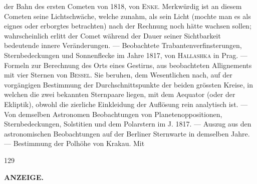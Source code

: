 der Bahn des ersten Cometen von 1818, von \textsc{Enke}. Merkwürdig ist an diesem Cometen seine Lichtschwäche, welche zunahm, als sein Licht (mochte man es als eignes oder erborgtes betrachten) nach der Rechnung noch hätte wachsen sollen; wahrscheinlich erlitt der Comet während der Dauer seiner Sichtbarkeit bedeutende innere Veränderungen. --- Beobachtete Trabantenverfinsterungen, Sternbedeckungen und Sonnenflecke im Jahre 1817, von \textsc{Hallashka} in Prag. --- Formeln zur Berechnung des Orts eines Gestirns, aus beobachteten Allignements mit vier Sternen von \textsc{Bessel}. Sie beruhen, dem Wesentlichen nach, auf der vorgängigen Bestimmung der Durchschnittspunkte der beiden grössten Kreise, in welchen die zwei bekannten Sternpaare liegen, mit dem Aequator (oder der Ekliptik), obwohl die zierliche Einkleidung der Auflösung rein analytisch ist. --- Von demselben Astronomen Beobachtungen von Planetenoppositionen, Sternbedeckungen, Solstitien und dem Polarstern im J. 1817. --- Auszug aus den astronomischen Beobachtungen auf der Berliner Sternwarte in demselben Jahre. --- Bestimmung der Polhöhe von Krakau. Mit\par
\vfill
{}\hfill{\small 129}\hspace*{.18\textwidth}\par
\clearpage
{}
\noindent{}%
\parbox[b]{\dimexpr\textwidth-20mm\relax}{\centering\small\textbf{ANZEIGE.}}%
\makebox[10mm][r]{}\par\nobreak\medskip
